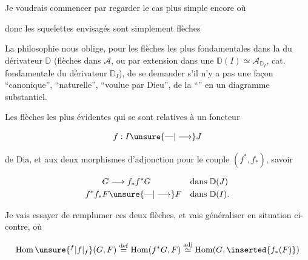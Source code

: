 Je voudrais commencer par regarder le cas plus simple encore où


donc  les squelettes envisagés sont simplement  flèches


La philosophie nous oblige, pour les flèches les plus fondamentales dans la  du dérivateur $\mathbb D$ (flèches dans $\mathcal A$, ou par extension dans une $\mathbb D(I)\simeq\mathcal A_{\mathbb D_I}$, cat. fondamentale du  dérivateur  $\mathbb D_I$), de se demander s'il n'y a pas
une façon ``canonique'', ``naturelle'', ``voulue par Dieu'', de la ``'' en un diagramme substantiel.

Les flèches les plus évidentes qui se  sont  relatives à un foncteur

\[
f:I\unsure{\text{---}|\longrightarrow}J
\]

de $\mathrm{Dia}$, et aux deux morphismes d'adjonction pour le couple $(f^*,f_*)$, savoir


\[
\begin{aligned}
G&\longrightarrow f_*f^*G&&\text{dans }\mathbb D(J)\\
f^*f_*F&\unsure{\text{---}|\longrightarrow}F&&\text{dans }\mathbb D(I).
\end{aligned}
\]

Je vais essayer de remplumer ces deux flèches, et vais généraliser en  situation ci-contre, où


\[
\operatorname{Hom}\unsure{{}^{f}|f|{}_{f}}(G,F)\overset{\mathrm{def}}{=}\operatorname{Hom}(f^*G,F)
\overset{\mathrm{adj}}{\simeq}\operatorname{Hom}(G,\inserted{f_*(F)})
\]

